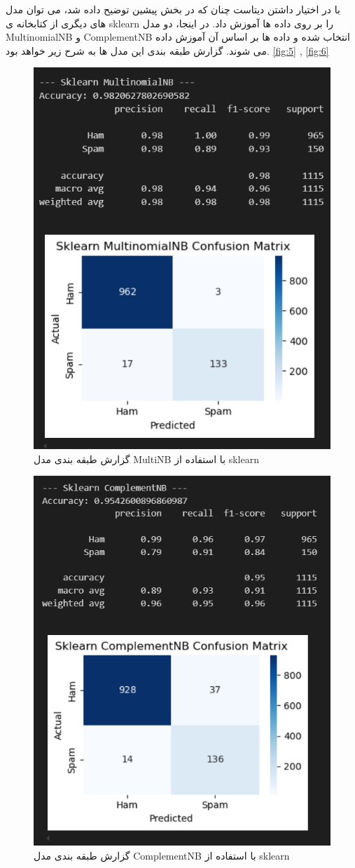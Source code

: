 \documentclass{article}
\begin{document}
با در اختیار داشتن دیتاست چنان که در بخش پیشین توضیح داده شد، می توان مدل های دیگری از کتابخانه ی sklearn را بر روی داده ها آموزش داد. در اینجا، دو مدل MultinomialNB و ComplementNB انتخاب شده و داده ها بر اساس آن آموزش داده می شوند. 
گزارش طبقه بندی این مدل ها به شرح زیر خواهد بود. \autoref{fig:5} , \autoref{fig:6}
\begin{figure}
    \centering
    \includegraphics[width=0.75\linewidth]{5.png}
    \caption{گزارش طبقه بندی مدل MultiNB با استفاده از sklearn}
    \label{fig:5}
\end{figure}
\begin{figure}[h!]
    \centering
\includegraphics[width=0.75\linewidth]{6.png}
    \caption{گزارش طبقه بندی مدل ComplementNB با استفاده از sklearn}
    \label{fig:6}
\end{figure}
\end{document}
